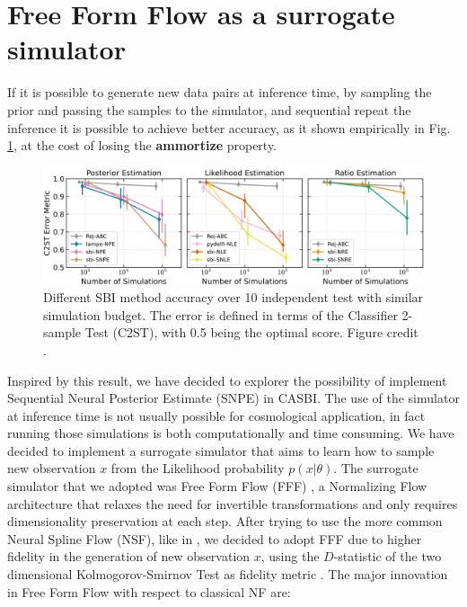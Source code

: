 \section{Free Form Flow as a surrogate simulator} 
If it is possible to generate new data pairs at inference time, by sampling the prior and passing the samples to the simulator, and sequential repeat the inference it is possible to achieve better accuracy, as it shown empirically in Fig. \ref{fig:sequential_SBI}, at the cost of losing the \textbf{ammortize} property.
\begin{figure}[H]
    \centering
    \includegraphics[width=1\textwidth]{./figure/sequential_SBI.png}
    \caption{Different SBI method accuracy over 10 independent test with similar simulation budget. The error is defined in terms of the Classifier 2-sample Test (C2ST), with 0.5 being the optimal score. Figure credit \cite{hoLtUILIAllinOneFramework2024}. }
    \label{fig:sequential_SBI}
\end{figure}

Inspired by this result, we have decided to explorer the possibility of implement Sequential Neural Posterior Estimate (SNPE) in CASBI. The use of the simulator at inference time is not usually possible for cosmological application, in fact running those simulations is both computationally and time consuming. We have decided to implement a surrogate simulator that aims to learn how to sample new observation $x$ from the Likelihood probability $p(x|\theta)$. The surrogate simulator that we adopted was Free Form Flow (FFF) \cite{draxlerFreeformFlowsMake2024}, a Normalizing Flow architecture that relaxes the need for invertible transformations and only requires dimensionality preservation at each step. After trying to use the more common Neural Spline Flow (NSF), like in \cite{wolfGalacticFlowLearningGeneralized2023}, we decided to adopt FFF due to higher fidelity in the generation of new observation $x$, using the $D$-statistic of the two dimensional Kolmogorov-Smirnov Test as fidelity metric \cite{lopesTwodimensionalKolmogorovSmirnovTest}. 
The major innovation in Free Form Flow with respect to classical NF are:

